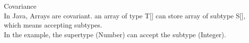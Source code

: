 Covariance \\ 

In Java, Arrays are covariant. an array of type T[] can store array of subtype S[], which means accepting subtypes.\\
In the example, the supertype (Number) can accept the subtype (Integer).\\
